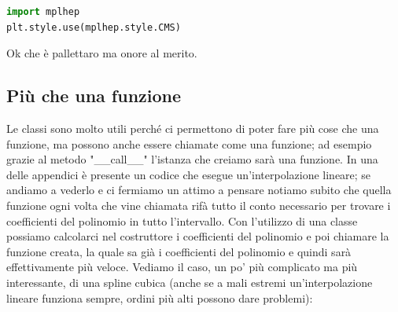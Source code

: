 \documentclass[10pt,a4paper]{article}
\begin{document}
\begin{lstlisting}[language=Python]
import mplhep
plt.style.use(mplhep.style.CMS)
\end{lstlisting}
Ok che è pallettaro ma onore al merito.
\subsection{Più che una funzione}
Le classi sono molto utili perché ci permettono di poter fare più cose che una funzione, ma possono anche essere chiamate come una funzione; ad esempio grazie al metodo "\_\_call\_\_" l'istanza che creiamo sarà una funzione. In una delle appendici è presente un codice che esegue un'interpolazione lineare; se andiamo a vederlo e ci fermiamo un attimo a pensare notiamo subito che quella funzione ogni volta che vine chiamata rifà tutto il conto necessario per trovare i coefficienti del polinomio in tutto l'intervallo. Con l'utilizzo di una classe possiamo calcolarci nel costruttore i coefficienti del polinomio e poi chiamare la funzione creata, la quale sa già i coefficienti del polinomio e quindi sarà effettivamente più veloce. Vediamo il caso, un po' più complicato ma più interessante, di una spline cubica (anche se a mali estremi un'interpolazione lineare funziona sempre, ordini più alti possono dare problemi):
\end{document}

